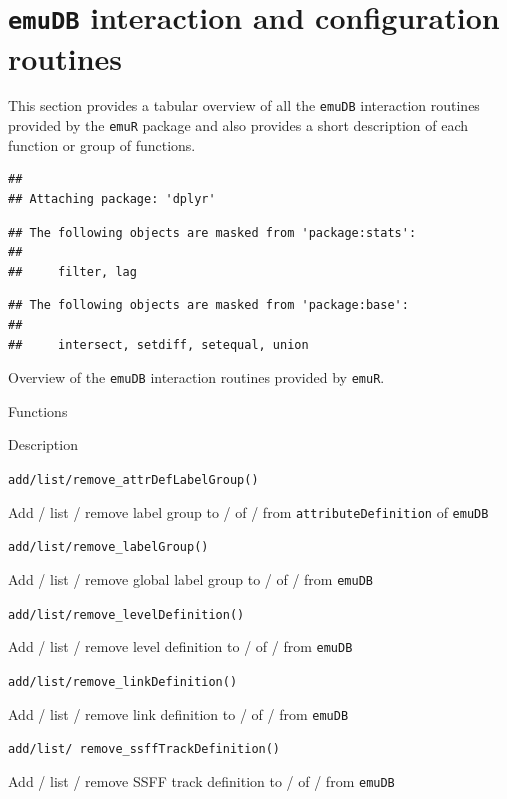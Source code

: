 \documentclass[]{book}
\begin{document}
\hypertarget{sec:emuRpackageDetails-emuDBinteract}{%
\section{\texorpdfstring{\texttt{emuDB} interaction and configuration routines}{emuDB interaction and configuration routines}}\label{sec:emuRpackageDetails-emuDBinteract}}

This section provides a tabular overview of all the \texttt{emuDB} interaction routines provided by the \texttt{emuR} package and also provides a short description of each function or group of functions.

\begin{verbatim}
## 
## Attaching package: 'dplyr'
\end{verbatim}

\begin{verbatim}
## The following objects are masked from 'package:stats':
## 
##     filter, lag
\end{verbatim}

\begin{verbatim}
## The following objects are masked from 'package:base':
## 
##     intersect, setdiff, setequal, union
\end{verbatim}

\label{tab:emuRpackageDetails-emuDBinteract}Overview of the \texttt{emuDB} interaction routines provided by \texttt{emuR}.

Functions

Description

\texttt{add/list/remove\_attrDefLabelGroup()}

Add / list / remove label group to / of / from \texttt{attributeDefinition} of \texttt{emuDB}

\texttt{add/list/remove\_labelGroup()}

Add / list / remove global label group to / of / from \texttt{emuDB}

\texttt{add/list/remove\_levelDefinition()}

Add / list / remove level definition to / of / from \texttt{emuDB}

\texttt{add/list/remove\_linkDefinition()}

Add / list / remove link definition to / of / from \texttt{emuDB}

\texttt{add/list/\ remove\_ssffTrackDefinition()}

Add / list / remove SSFF track definition to / of / from \texttt{emuDB}
\end{document}
